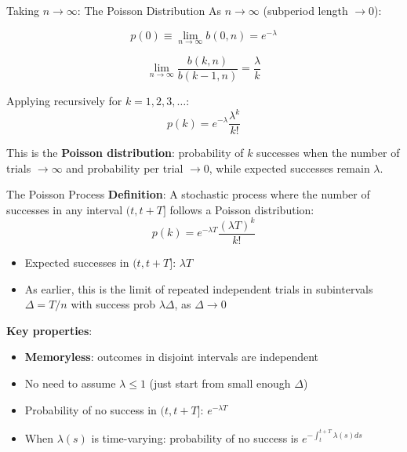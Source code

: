 \documentclass[blue]{beamer}
\begin{document}
\begin{frame}{Taking $n \to \infty$: The Poisson Distribution}
	As $n \to \infty$ (subperiod length $\to 0$):
	
	\[
	p(0) \equiv \lim_{n\to\infty} b(0,n) = e^{-\lambda}
	\]
	
	\[
	\lim_{n\to\infty} \frac{b(k,n)}{b(k-1,n)} = \frac{\lambda}{k}
	\]
	
	\bigskip
	Applying recursively for $k = 1, 2, 3, \ldots$:
	\[
	{p(k) = e^{-\lambda} \frac{\lambda^k}{k!}}
	\]
	
	This is the \textbf{Poisson distribution}: probability of $k$ successes when the number of trials $\to \infty$ and probability per trial $\to 0$, while expected successes remain $\lambda$.
\end{frame}

\begin{frame}{The Poisson Process}
	\textbf{Definition}: A stochastic process where the number of successes in any interval $(t, t+T]$ follows a Poisson distribution:
	\[
	p(k) = e^{-\lambda T} \frac{(\lambda T)^k}{k!}
	\]
	
	\begin{itemize}
		\item Expected successes in $(t, t+T]$: $\lambda T$
		\item As earlier, this is the limit of repeated independent trials in subintervals $\Delta = T/n$ with success prob $\lambda\Delta$, as $\Delta \to 0$
	\end{itemize}
	
\medskip
	\textbf{Key properties}:
	\begin{itemize}
		\item \textbf{Memoryless}: outcomes in disjoint intervals are independent
		\item No need to assume $\lambda \leq 1$ (just start from small enough $\Delta$)
		\item Probability of no success in $(t, t+T]$: $e^{-\lambda T}$
		\item When $\lambda(s)$ is time-varying: probability of no success is $e^{-\int_t^{t+T} \lambda(s) ds}$
	\end{itemize}
\end{frame}
\end{document}
